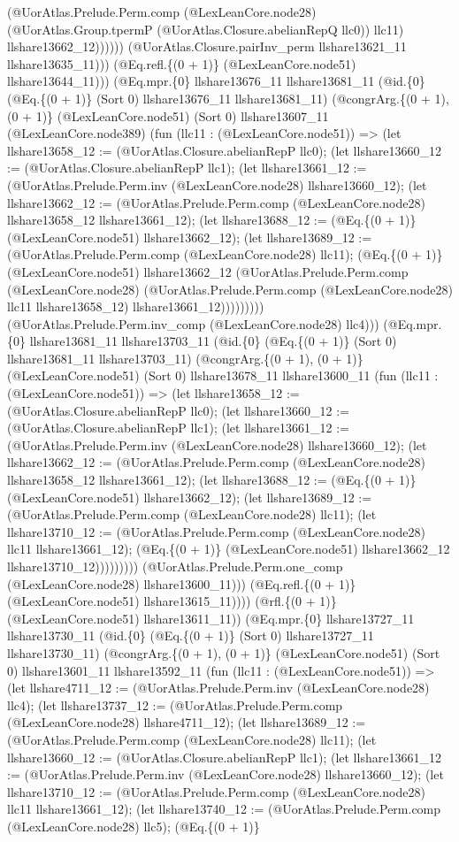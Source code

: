 \documentclass[11pt]{article}
\begin{document}
(@UorAtlas.Prelude.Perm.comp (@LexLeanCore.node28) (@UorAtlas.Group.tpermP (@UorAtlas.Closure.abelianRepQ llc0)) llc11) llshare13662\_12)))))) (@UorAtlas.Closure.pairInv\_perm llshare13621\_11 llshare13635\_11))) (@Eq.refl.\{(0 + 1)\} (@LexLeanCore.node51) llshare13644\_11))) (@Eq.mpr.\{0\} llshare13676\_11 llshare13681\_11 (@id.\{0\} (@Eq.\{(0 + 1)\} (Sort 0) llshare13676\_11 llshare13681\_11) (@congrArg.\{(0 + 1), (0 + 1)\} (@LexLeanCore.node51) (Sort 0) llshare13607\_11 (@LexLeanCore.node389) (fun (llc11 : (@LexLeanCore.node51)) => (let llshare13658\_12 := (@UorAtlas.Closure.abelianRepP llc0); (let llshare13660\_12 := (@UorAtlas.Closure.abelianRepP llc1); (let llshare13661\_12 := (@UorAtlas.Prelude.Perm.inv (@LexLeanCore.node28) llshare13660\_12); (let llshare13662\_12 := (@UorAtlas.Prelude.Perm.comp (@LexLeanCore.node28) llshare13658\_12 llshare13661\_12); (let llshare13688\_12 := (@Eq.\{(0 + 1)\} (@LexLeanCore.node51) llshare13662\_12); (let llshare13689\_12 := (@UorAtlas.Prelude.Perm.comp (@LexLeanCore.node28) llc11); (@Eq.\{(0 + 1)\} (@LexLeanCore.node51) llshare13662\_12 (@UorAtlas.Prelude.Perm.comp (@LexLeanCore.node28) (@UorAtlas.Prelude.Perm.comp (@LexLeanCore.node28) llc11 llshare13658\_12) llshare13661\_12))))))))) (@UorAtlas.Prelude.Perm.inv\_comp (@LexLeanCore.node28) llc4))) (@Eq.mpr.\{0\} llshare13681\_11 llshare13703\_11 (@id.\{0\} (@Eq.\{(0 + 1)\} (Sort 0) llshare13681\_11 llshare13703\_11) (@congrArg.\{(0 + 1), (0 + 1)\} (@LexLeanCore.node51) (Sort 0) llshare13678\_11 llshare13600\_11 (fun (llc11 : (@LexLeanCore.node51)) => (let llshare13658\_12 := (@UorAtlas.Closure.abelianRepP llc0); (let llshare13660\_12 := (@UorAtlas.Closure.abelianRepP llc1); (let llshare13661\_12 := (@UorAtlas.Prelude.Perm.inv (@LexLeanCore.node28) llshare13660\_12); (let llshare13662\_12 := (@UorAtlas.Prelude.Perm.comp (@LexLeanCore.node28) llshare13658\_12 llshare13661\_12); (let llshare13688\_12 := (@Eq.\{(0 + 1)\} (@LexLeanCore.node51) llshare13662\_12); (let llshare13689\_12 := (@UorAtlas.Prelude.Perm.comp (@LexLeanCore.node28) llc11); (let llshare13710\_12 := (@UorAtlas.Prelude.Perm.comp (@LexLeanCore.node28) llc11 llshare13661\_12); (@Eq.\{(0 + 1)\} (@LexLeanCore.node51) llshare13662\_12 llshare13710\_12))))))))) (@UorAtlas.Prelude.Perm.one\_comp (@LexLeanCore.node28) llshare13600\_11))) (@Eq.refl.\{(0 + 1)\} (@LexLeanCore.node51) llshare13615\_11)))) (@rfl.\{(0 + 1)\} (@LexLeanCore.node51) llshare13611\_11)) (@Eq.mpr.\{0\} llshare13727\_11 llshare13730\_11 (@id.\{0\} (@Eq.\{(0 + 1)\} (Sort 0) llshare13727\_11 llshare13730\_11) (@congrArg.\{(0 + 1), (0 + 1)\} (@LexLeanCore.node51) (Sort 0) llshare13601\_11 llshare13592\_11 (fun (llc11 : (@LexLeanCore.node51)) => (let llshare4711\_12 := (@UorAtlas.Prelude.Perm.inv (@LexLeanCore.node28) llc4); (let llshare13737\_12 := (@UorAtlas.Prelude.Perm.comp (@LexLeanCore.node28) llshare4711\_12); (let llshare13689\_12 := (@UorAtlas.Prelude.Perm.comp (@LexLeanCore.node28) llc11); (let llshare13660\_12 := (@UorAtlas.Closure.abelianRepP llc1); (let llshare13661\_12 := (@UorAtlas.Prelude.Perm.inv (@LexLeanCore.node28) llshare13660\_12); (let llshare13710\_12 := (@UorAtlas.Prelude.Perm.comp (@LexLeanCore.node28) llc11 llshare13661\_12); (let llshare13740\_12 := (@UorAtlas.Prelude.Perm.comp (@LexLeanCore.node28) llc5); (@Eq.\{(0 + 1)\} 
\end{document}
